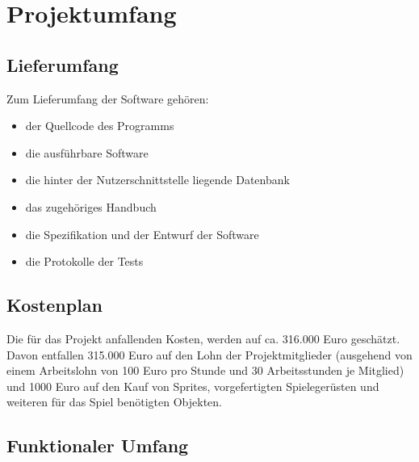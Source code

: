 

\chapter{Projektumfang}

\section{Lieferumfang}

Zum Lieferumfang der Software geh\"oren:

\begin{itemize}
	\item der Quellcode des Programms
	\item die ausf\"uhrbare Software
	\item die hinter der Nutzerschnittstelle liegende Datenbank
	\item das zugeh\"origes Handbuch
	\item die Spezifikation und der Entwurf der Software
	\item die Protokolle der Tests
	
\end{itemize}

\section{Kostenplan}

Die f\"ur das Projekt anfallenden Kosten, werden auf ca. 316.000 Euro gesch\"atzt. Davon entfallen
315.000 Euro auf den Lohn der Projektmitglieder (ausgehend von einem Arbeitslohn von 100 Euro pro Stunde und 30 Arbeitsstunden je Mitglied) 
und 1000 Euro auf den Kauf von Sprites, vorgefertigten Spieleger\"usten und weiteren f\"ur das Spiel ben\"otigten Objekten.

\section{Funktionaler Umfang}

